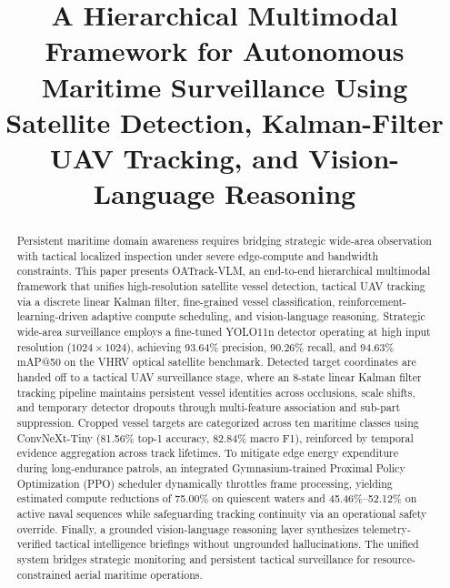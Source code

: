 \documentclass[conference]{IEEEtran}
\begin{document}
\title{
A Hierarchical Multimodal Framework for Autonomous Maritime Surveillance Using Satellite Detection, Kalman-Filter UAV Tracking, and Vision-Language Reasoning
}

\author{
\and
{}
}

\maketitle

\begin{abstract}
Persistent maritime domain awareness requires bridging strategic wide-area observation with tactical localized inspection under severe edge-compute and bandwidth constraints. This paper presents OATrack-VLM, an end-to-end hierarchical multimodal framework that unifies high-resolution satellite vessel detection, tactical UAV tracking via a discrete linear Kalman filter, fine-grained vessel classification, reinforcement-learning-driven adaptive compute scheduling, and vision-language reasoning. Strategic wide-area surveillance employs a fine-tuned YOLO11n detector operating at high input resolution ($1024\times1024$), achieving 93.64\% precision, 90.26\% recall, and 94.63\% mAP@50 on the VHRV optical satellite benchmark. Detected target coordinates are handed off to a tactical UAV surveillance stage, where an 8-state linear Kalman filter tracking pipeline maintains persistent vessel identities across occlusions, scale shifts, and temporary detector dropouts through multi-feature association and sub-part suppression. Cropped vessel targets are categorized across ten maritime classes using ConvNeXt-Tiny (81.56\% top-1 accuracy, 82.84\% macro F1), reinforced by temporal evidence aggregation across track lifetimes. To mitigate edge energy expenditure during long-endurance patrols, an integrated Gymnasium-trained Proximal Policy Optimization (PPO) scheduler dynamically throttles frame processing, yielding estimated compute reductions of 75.00\% on quiescent waters and 45.46\%--52.12\% on active naval sequences while safeguarding tracking continuity via an operational safety override. Finally, a grounded vision-language reasoning layer synthesizes telemetry-verified tactical intelligence briefings without ungrounded hallucinations. The unified system bridges strategic monitoring and persistent tactical surveillance for resource-constrained aerial maritime operations.
\end{abstract}
\end{document}
